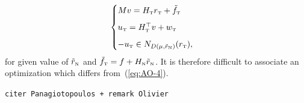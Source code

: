 \begin{equation}\label{eq:soccp1-tangent}
  \begin{cases}
    M v = {H_\t} {r_\t} + {\tilde f_\t} \\[2mm]
    u_\t = H_\t^\top v + w_\t \\[2mm]
    -u_\t \in N_{D(\mu,\tilde r_{\n})}(r_\t),
  \end{cases}
\end{equation}
for  given value of  $\tilde r_{\hbox{\tiny{N}}}$ and $\tilde f_{\hbox{\tiny{T}}} = f + H_{\hbox{\tiny{N}}} \tilde r_{\hbox{\tiny{N}}}$. It is therefore difficult to associate an optimization which differs from~(\ref{eq:AO-4}).  



\texttt{citer Panagiotopoulos + remark Olivier}

